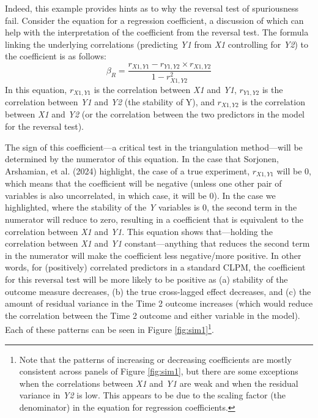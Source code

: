 \documentclass[
  man,floatsintext]{apa6}
\begin{document}
Indeed, this example provides hints as to why the reversal test of spuriousness fail. Consider the equation for a regression coefficient, a discussion of which can help with the interpretation of the coefficient from the reversal test. The formula linking the underlying correlations (predicting \emph{Y1} from \emph{X1} controlling for \emph{Y2}) to the coefficient is as follows: \[\beta_{R} = \frac{r_{X1,Y1} - r_{Y1,Y2} \times r_{X1,Y2}} {1 - r_{X1,Y2}^{2}}\] In this equation, \(r_{X1,Y1}\) is the correlation between \emph{X1} and \emph{Y1}, \(r_{Y1,Y2}\) is the correlation between \emph{Y1} and \emph{Y2} (the stability of Y), and \(r_{X1,Y2}\) is the correlation between \emph{X1} and \emph{Y2} (or the correlation between the two predictors in the model for the reversal test).

The sign of this coefficient---a critical test in the triangulation method---will be determined by the numerator of this equation. In the case that Sorjonen, Arshamian, et al. (2024) highlight, the case of a true experiment, \(r_{X1,Y1}\) will be 0, which means that the coefficient will be negative (unless one other pair of variables is also uncorrelated, in which case, it will be 0). In the case we highlighted, where the stability of the \emph{Y} variables is 0, the second term in the numerator will reduce to zero, resulting in a coefficient that is equivalent to the correlation between \emph{X1} and \emph{Y1}. This equation shows that---holding the correlation between \emph{X1} and \emph{Y1} constant---anything that reduces the second term in the numerator will make the coefficient less negative/more positive. In other words, for (positively) correlated predictors in a standard CLPM, the coefficient for this reversal test will be more likely to be positive as (a) stability of the outcome measure decreases, (b) the true cross-lagged effect decreases, and (c) the amount of residual variance in the Time 2 outcome increases (which would reduce the correlation between the Time 2 outcome and either variable in the model). Each of these patterns can be seen in Figure \ref{fig:sim1}\footnote{Note that the patterns of increasing or decreasing coefficients are mostly consistent across panels of Figure \ref{fig:sim1}, but there are some exceptions when the correlations between \emph{X1} and \emph{Y1} are weak and when the residual variance in \emph{Y2} is low. This appears to be due to the scaling factor (the denominator) in the equation for regression coefficients.}.
\end{document}
